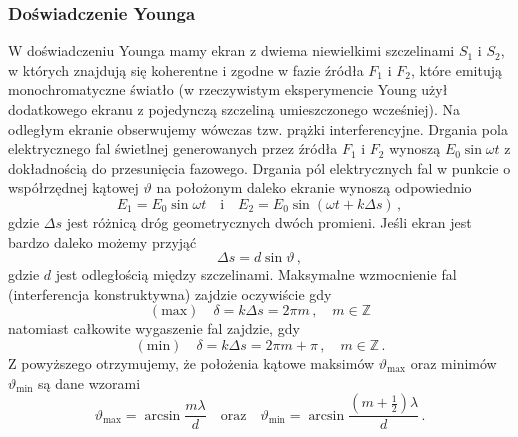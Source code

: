 \documentclass[../main.tex]{subfiles}
\begin{document}
\subsubsection{Doświadczenie Younga}
W doświadczeniu Younga mamy ekran z dwiema niewielkimi szczelinami \(S_1\) i \(S_2\), w których
znajdują się koherentne i zgodne w fazie źródła \(F_1\) i \(F_2\), które emitują monochromatyczne
światło (w rzeczywistym eksperymencie Young użył dodatkowego ekranu z pojedynczą szczeliną
umieszczonego wcześniej). Na odległym ekranie obserwujemy wówczas tzw. prążki interferencyjne.
Drgania pola elektrycznego fal świetlnej generowanych przez źródła \(F_1\) i \(F_2\) wynoszą
\(E_0\sin\omega t\) z dokładnością do przesunięcia fazowego. Drgania pól elektrycznych fal w punkcie
o współrzędnej kątowej \(\vartheta\) na położonym daleko ekranie wynoszą odpowiednio
\begin{equation*}
    E_1=E_0\sin\omega t\quad\text{i}\quad E_2=E_0\sin(\omega t+k\Delta s)\,,
\end{equation*}
gdzie \(\Delta s\) jest różnicą dróg geometrycznych dwóch promieni. Jeśli ekran jest bardzo daleko
możemy przyjąć
\begin{equation*}
    \Delta s=d\sin\vartheta\,,
\end{equation*}
gdzie \(d\) jest odległością między szczelinami. Maksymalne wzmocnienie fal (interferencja
konstruktywna) zajdzie oczywiście gdy
\begin{equation*}
    (\text{max})\quad \delta=k\Delta s=2\pi m\,,\quad m\in\mathbb{Z}
\end{equation*}
natomiast całkowite wygaszenie fal zajdzie, gdy
\begin{equation*}
    (\text{min})\quad \delta=k\Delta s=2\pi m +\pi\,,\quad m\in\mathbb{Z}\,.
\end{equation*}
Z powyższego otrzymujemy, że położenia kątowe maksimów \(\vartheta_\text{max}\) oraz minimów
\(\vartheta_\text{min}\) są dane wzorami
\begin{equation*}
    \vartheta_\text{max}=\arcsin\frac{m\lambda}{d}\quad\text{oraz}\quad \vartheta_\text{min}=\arcsin\frac{(m+\frac{1}{2})\lambda}{d}\,.
\end{equation*}
\end{document}
